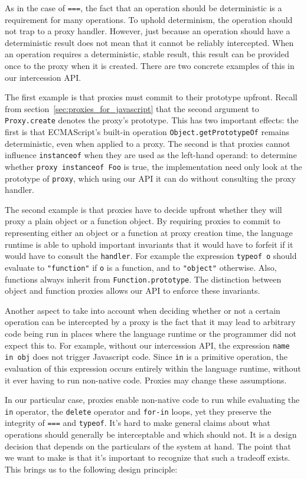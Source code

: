 \documentclass{sig-alternate}
\begin{document}
As in the case of \texttt{===}, the fact that an operation should be deterministic is a requirement for many operations. To uphold determinism, the operation should not trap to a proxy handler. However, just because an operation should have a deterministic result does not mean that it cannot be reliably intercepted. When an operation requires a deterministic, stable result, this result can be provided once to the proxy when it is created. There are two concrete examples of this in our intercession API.

The first example is that proxies must commit to their prototype upfront. Recall from section~\ref{sec:proxies_for_javascript} that the second argument to \texttt{Proxy.create} denotes the proxy's prototype. This has two important effects: the first is that ECMAScript's built-in operation \texttt{Object.getPrototypeOf} remains deterministic, even when applied to a proxy. The second is that proxies cannot influence \texttt{instanceof} when they are used as the left-hand operand: to determine whether \texttt{proxy instanceof Foo} is true, the implementation need only look at the prototype of \texttt{proxy}, which using our API it can do without consulting the proxy handler.

The second example is that proxies have to decide upfront whether they will proxy a plain object or a function object. By requiring proxies to commit to representing either an object or a function at proxy creation time, the language runtime is able to uphold important invariants that it would have to forfeit if it would have to consult the \texttt{handler}. For example the expression \texttt{typeof o} should evaluate to \texttt{"function"} if \texttt{o} is a function, and to \texttt{"object"} otherwise. Also, functions always inherit from \texttt{Function.prototype}. The distinction between object and function proxies allows our API to enforce these invariants.

Another aspect to take into account when deciding whether or not a certain operation can be intercepted by a proxy is the fact that it may lead to arbitrary code being run in places where the language runtime or the programmer did not expect this to. For example, without our intercession API, the expression \texttt{name in obj} does not trigger Javascript code. Since \texttt{in} is a primitive operation, the evaluation of this expression occurs entirely within the language runtime, without it ever having to run non-native code. Proxies may change these assumptions.

In our particular case, proxies enable non-native code to run while evaluating the \texttt{in} operator, the \texttt{delete} operator and \texttt{for-in} loops, yet they preserve the integrity of \texttt{===} and \texttt{typeof}. It's hard to make general claims about what operations should generally be interceptable and which should not. It is a design decision that depends on the particulars of the system at hand. The point that we want to make is that it's important to recognize that such a tradeoff exists. This brings us to the following design principle:
\end{document}
